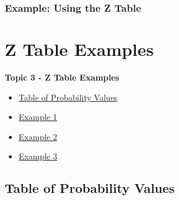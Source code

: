 \documentclass[fleqn]{beamer} %
\newcommand{\sectionIIItitle}{Z Table Examples}
\newcommand{\sectionIIsubsectionIVtitle}{Example: Using the Z Table}
\newcommand{\sectionIIIsubsectionItitle}{Table of Probability Values}
\newcommand{\sectionIIIsubsectionIItitle}{Example 1}
\newcommand{\sectionIIIsubsectionIIItitle}{Example 2}
\newcommand{\sectionIIIsubsectionIVtitle}{Example 3}
\begin{document}
			\begin{frame}
				\frametitle{\sectionIIsubsectionIVtitle}



			\end{frame}

			\begin{frame}



			\end{frame}


		
	\section{\sectionIIItitle}\label{sectionIII}

		\begin{frame}
			\large \textbf{Topic 3 - \sectionIIItitle} \vspace{3mm}\\

			\begin{itemize}
				\item \hyperlink{sectionIIIsubsectionI}{\sectionIIIsubsectionItitle} \vspc %
				\item \hyperlink{sectionIIIsubsectionII}{\sectionIIIsubsectionIItitle} \vspc %
				\item \hyperlink{sectionIIIsubsectionIII}{\sectionIIIsubsectionIIItitle} \vspc %
				\item \hyperlink{sectionIIIsubsectionIV}{\sectionIIIsubsectionIVtitle} \vspc %
			\end{itemize}

		\end{frame}

		\subsection{\sectionIIIsubsectionItitle}\label{sectionIIIsubsectionI}
\end{document}
